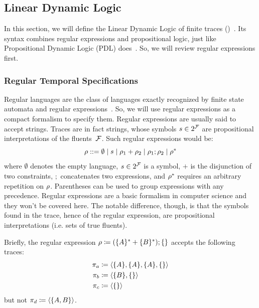 \subsection{Linear Dynamic Logic}

In this section, we will define the Linear Dynamic Logic of finite traces
(\ldl{})~\cite{bib:ltlf-ldlf}. Its syntax combines regular expressions and
propositional logic, just like Propositional Dynamic Logic (PDL)
does~\cite{bib:pdl}\cite{bib:pdl-stanford}. So, we will review regular
expressions first.


\subsubsection{Regular Temporal Specifications}

Regular languages are the class of languages exactly recognized by finite
state automata and regular expressions~\cite{bib:languages-book}. So, we will
use regular expressions as a compact formalism to specify them. Regular
expressions are usually said to accept strings. Traces are in fact strings,
whose symbols $s \in 2^{\mathcal{F}}$ are propositional interpretations of the
fluents~$\mathcal{F}$. Such regular expressions would be:
\begin{equation}
	\rho ::= \emptyset \mid s \mid
	\rho_1 + \rho_2 \mid \rho_1 ; \rho_2 \mid \rho^*
	\label{eq:re-no}
\end{equation}
where $\emptyset$ denotes the empty language, $s \in 2^{\mathcal{F}}$ is a symbol,
$+$ is the disjunction of two constraints, $;$ concatenates two
expressions, and $\rho^*$ requires an arbitrary repetition on $\rho$.
Parentheses can be used to group expressions with any precedence.
Regular expressions are a basic formalism in computer science and they won't
be covered here. The notable difference, though, is that the symbols found in
the trace, hence of the regular expression, are propositional interpretations
(i.e. sets of true fluents).

\begin{example}
	Briefly, the regular expression $\rho \coloneqq (\{A\}^* + \{B\}^*) ;
	\{\}$ accepts the following traces:
	\begin{align*}
		\pi_a &\coloneqq \langle \{A\}, \{A\}, \{A\}, \{\} \rangle \\
		\pi_b &\coloneqq \langle \{B\}, \{\} \rangle \\
		\pi_c &\coloneqq \langle \{\} \rangle \\
	\end{align*}
	but not $\pi_d \coloneqq \langle \{A, B\} \rangle$.
\end{example}


